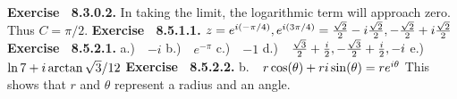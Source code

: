  {\noindent \protect \bf  Exercise ~8.3.0.2.} In taking the limit, the logarithmic term will approach zero. Thus $C=\pi /2$. \protect \newline  \protect \newline  
 {\noindent \protect \bf  Exercise ~8.5.1.1.} $z=e^{i (-\pi /4)}, e^{i(3 \pi /4)} = \protect \frac  {\protect \sqrt  {2}}{2} - i \protect \frac  {\protect \sqrt  {2}}{2},-\protect \frac  {\protect \sqrt  {2}}{2} + i \protect \frac  {\protect \sqrt  {2}}{2}$  \protect \newline  \protect \newline  
 {\noindent \protect \bf  Exercise ~8.5.2.1.} a.)~~$-i$ \protect \newline  b.)~~$e^{-\pi }$ \protect \newline  c.)~~$-1$ \protect \newline  d.)~~$\protect \frac  {\protect \sqrt  {3}}{2} + \protect \frac  {i}{2}, -\protect \frac  {\protect \sqrt  {3}}{2} + \protect \frac  {i}{2}, -i$ \protect \newline  e.)~~$\protect \qopname  \relax o{ln}{7} + i \protect \qopname  \relax o{arctan}{\protect \sqrt  {3}/12}$  \protect \newline  \protect \newline  
 {\noindent \protect \bf  Exercise ~8.5.2.2.} b.~~$r\protect \qopname  \relax o{cos}(\theta )+ri \protect \qopname  \relax o{sin}(\theta ) = re^{i \theta }$ This shows that $r$ and $\theta $ represent a radius and an angle.  \protect \newline  \protect \newline  
